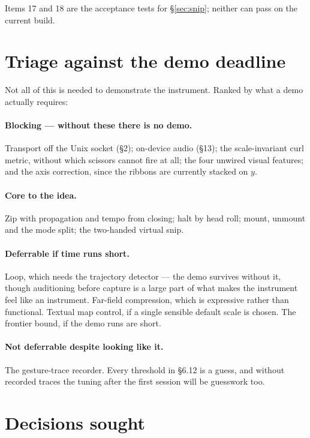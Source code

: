 \documentclass[11pt,a4paper]{article}
\theoremstyle{definition}
\theoremstyle{plain}
\theoremstyle{remark}
\begin{document}
Items 17 and 18 are the acceptance tests for \S\ref{sec:snip}; neither can pass on the current
build.

\section{Triage against the demo deadline}
\label{sec:demo}

Not all of this is needed to demonstrate the instrument. Ranked by what a demo actually requires:

\paragraph{Blocking --- without these there is no demo.} Transport off the Unix socket
(\S2); on-device audio (\S13); the scale-invariant curl metric, without which scissors cannot fire
at all; the four unwired visual features; and the axis correction, since the ribbons are currently
stacked on $y$.

\paragraph{Core to the idea.} Zip with propagation and tempo from closing; halt by head roll;
mount, unmount and the mode split; the two-handed virtual snip.

\paragraph{Deferrable if time runs short.} Loop, which needs the trajectory detector --- the
demo survives without it, though auditioning before capture is a large part of what makes the
instrument feel like an instrument. Far-field compression, which is expressive rather than
functional. Textual map control, if a single sensible default scale is chosen. The frontier bound,
if the demo runs are short.

\paragraph{Not deferrable despite looking like it.} The gesture-trace recorder. Every threshold in
\S6.12 is a guess, and without recorded traces the tuning after the first session will be guesswork
too.

\section{Decisions sought}
\label{sec:decisions}
\end{document}

